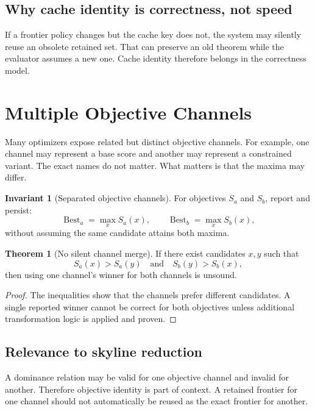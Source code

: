 \documentclass[11pt,oneside]{article}
\theoremstyle{definition}
\newtheorem{invariant}{Invariant}[section]
\newtheorem{theorem}{Theorem}[section]
\newcommand{\score}{S}
\begin{document}
\subsection{Why cache identity is correctness, not speed}
If a frontier policy changes but the cache key does not, the system may silently reuse an obsolete retained set. That can preserve an old theorem while the evaluator assumes a new one. Cache identity therefore belongs in the correctness model.

\section{Multiple Objective Channels}

Many optimizers expose related but distinct objective channels. For example, one channel may represent a base score and another may represent a constrained variant. The exact names do not matter. What matters is that the maxima may differ.

\begin{invariant}[Separated objective channels]
For objectives \(\score_a\) and \(\score_b\), report and persist:
\[
  \operatorname{Best}_a=\max_x\score_a(x),
  \qquad
  \operatorname{Best}_b=\max_x\score_b(x),
\]
without assuming the same candidate attains both maxima.
\end{invariant}

\begin{theorem}[No silent channel merge]
If there exist candidates \(x,y\) such that
\[
  \score_a(x)>\score_a(y)
  \quad\text{and}\quad
  \score_b(y)>\score_b(x),
\]
then using one channel's winner for both channels is unsound.
\end{theorem}

\begin{proof}
The inequalities show that the channels prefer different candidates. A single reported winner cannot be correct for both objectives unless additional transformation logic is applied and proven.
\end{proof}

\subsection{Relevance to skyline reduction}
A dominance relation may be valid for one objective channel and invalid for another. Therefore objective identity is part of context. A retained frontier for one channel should not automatically be reused as the exact frontier for another.
\end{document}
